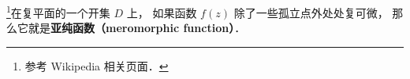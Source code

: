 
\begin{issues}
\issueDraft
\end{issues}

\footnote{参考 Wikipedia 相关页面．}在复平面的一个开集 $D$ 上， 如果函数 $f(z)$ 除了一些孤立点外处处复可微， 那么它就是\textbf{亚纯函数（meromorphic function）}．
